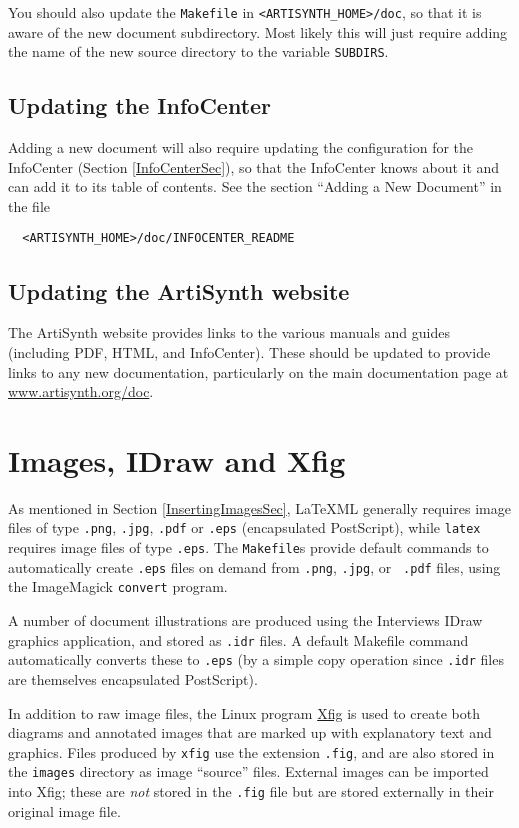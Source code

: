 \documentclass{article}
\begin{document}
You should also update the {\tt Makefile} in {\tt <ARTISYNTH\_HOME>/doc},
so that it is aware of the new document subdirectory. Most
likely this will just require adding the name of the new source
directory to the variable {\tt SUBDIRS}.

\subsection{Updating the InfoCenter}

Adding a new document will also require updating the configuration for
the InfoCenter (Section \ref{InfoCenterSec}), so that the InfoCenter
knows about it and can add it to its table of contents. See the
section ``Adding a New Document'' in the file
\begin{verbatim}
  <ARTISYNTH_HOME>/doc/INFOCENTER_README
\end{verbatim}

\subsection{Updating the ArtiSynth website}

The ArtiSynth website provides links to the various manuals and guides
(including PDF, HTML, and InfoCenter). These should be updated to
provide links to any new documentation, particularly on the main
documentation page at
\href{https://www.artisynth.org/doc}{www.artisynth.org/doc}.

\section{Images, IDraw and Xfig}
\label{ImagesSec}

As mentioned in Section \ref{InsertingImagesSec}, LaTeXML generally
requires image files of type {\tt .png}, {\tt .jpg}, {\tt .pdf} or
{\tt .eps} (encapsulated PostScript), while 
{\tt latex} requires image files of type {\tt .eps}. 
The {\tt Makefile}s provide default commands to automatically
create {\tt .eps} files on demand from {\tt .png}, {\tt .jpg}, or {\tt
.pdf} files, using the ImageMagick {\tt convert} program. 

A number of document illustrations are produced using the Interviews
IDraw graphics application, and stored as {\tt .idr} files. A default
Makefile command automatically converts these to {\tt .eps} (by a
simple copy operation since {\tt .idr} files are themselves
encapsulated PostScript).

In addition to raw image files, the Linux program
\href{http://www.xfig.org}{Xfig} is used to create both diagrams and
annotated images that are marked up with explanatory text and
graphics.  Files produced by {\tt xfig} use the extension {\tt .fig},
and are also stored in the {\tt images} directory as image ``source''
files.  External images can be imported into Xfig; these are {\it not}
stored in the {\tt .fig} file but are stored externally in their
original image file.
\end{document}
